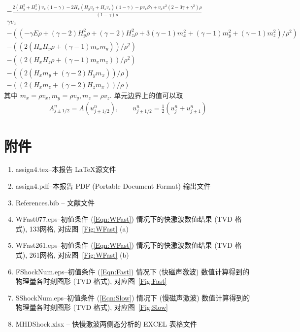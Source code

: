 \documentclass[10.5pt
]{article}
\begin{document}
\begin{subequations}
	\begin{gather}
-\frac{2 (H_y^2+H_z^2) v_x (1- \gamma) -2 H_x (H_y v_y+H_z v_z )(1 - \gamma) - p v_x \beta \gamma + v_x v^2 (2 - 3 \gamma + \gamma^2) \rho}{(1 - \gamma) \rho}\\
  \gamma v_x   \\
  -((-\gamma E \rho+(\gamma-2) H_y^2 \rho+(\gamma-2) H_z^2 \rho+3 (\gamma-1) m_x^2+(\gamma-1) m_y^2+(\gamma-1) m_z^2)/\rho^2)   \\
  -((2 (H_x H_y \rho+(\gamma-1) m_x m_y))/\rho^2)   \\
  -((2 (H_x H_z \rho+(\gamma-1) m_x m_z))/\rho^2)   \\
  -((2 (H_x m_y+(\gamma-2) H_y m_x))/\rho)   \\
  -((2 (H_x m_z+(\gamma-2) H_z m_x))/\rho) 
\end{gather}
\end{subequations}
其中
$ m_x = \rho v_x,
m_y = \rho v_y,
m_z = \rho v_z.$
单元边界上的值可以取
\begin{align}
A_{j \pm 1/2}^n = A(u_{j \pm 1/2}^n), \qquad u_{j \pm 1/2}^n = \frac{1}{2} (u_j^n + u_{j \pm 1}^n)
\end{align}
\section{附件}
\begin{enumerate}
\item
assign4.tex--本报告 \LaTeX 源文件
\item
assign4.pdf--本报告 PDF (Portable Document Format) 输出文件
\item
References.bib -- 文献文件
\item
WFast077.eps--初值条件 (\ref{Eqn:WFast}) 情况下的快激波数值结果 (TVD 格式), 133网格, 对应图~\ref{Fig:WFast} (a)
\item
WFast261.eps--初值条件 (\ref{Eqn:WFast}) 情况下的快激波数值结果 (TVD 格式), 261网格, 对应图~\ref{Fig:WFast} (b)
\item
FShockNum.eps--初值条件 (\ref{Eqn:Fast}) 情况下 (快磁声激波) 数值计算得到的物理量各时刻图形 (TVD 格式), 对应图~\ref{Fig:Fast}
\item
SShockNum.eps--初值条件 (\ref{Eqn:Slow}) 情况下 (慢磁声激波) 数值计算得到的物理量各时刻图形 (TVD 格式), 对应图~\ref{Fig:Slow}
\item
MHDShock.xlsx -- 快慢激波两侧态分析的 EXCEL 表格文件
\end{enumerate}


% 
%


\end{document}
